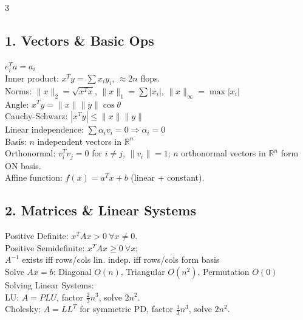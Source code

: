 \documentclass[8pt,landscape]{extarticle}
\newcommand{\R}{\mathbb{R}}
\newcommand{\norm}[1]{\|#1\|}
\newcommand{\1}{\mathbf{1}}
\newcommand{\0}{\mathbf{0}}
\begin{document}
\begin{multicols*}{3}

\subsection*{1. Vectors \& Basic Ops}
$e_i^Ta=a_i$\\
Inner product: $x^Ty = \sum x_i y_i$, $\approx 2n$ flops. \\
Norms: $\norm{x}_2 = \sqrt{x^Tx}$, $\norm{x}_1 = \sum|x_i|$, $\norm{x}_\infty = \max|x_i|$ \\
Angle: $x^Ty = \norm{x}\norm{y}\cos\theta$ \\
Cauchy-Schwarz: $|x^Ty| \le \norm{x}\norm{y}$\\
Linear independence: $\sum\alpha_i v_i=0 \Rightarrow \alpha_i=0$ \\
Basis: $n$ independent vectors in $\R^n$ \\
Orthonormal: $v_i^Tv_j=0$ for $i\ne j$, $\|v_i\|=1$; $n$ orthonormal vectors in $\R^n$ form ON basis.\\
Affine function: $f(x)=a^Tx+b$ (linear + constant).

\subsection*{2. Matrices \& Linear Systems}
Positive Definite: $x^TAx>0\ \forall x\ne0$. \\
Positive Semidefinite: $x^TAx\ge0\ \forall x$; \\
$A^{-1}$ exists iff rows/cols lin. indep. iff rows/cols form basis \\
Solve $Ax=b$: Diagonal $O(n)$, Triangular $O(n^2)$, Permutation $O(0)$ \\
Solving Linear Systems: \\
LU: $A=PLU$, factor $\frac23n^3$, solve $2n^2$. \\
Cholesky: $A=LL^T$ for symmetric PD, factor $\frac13n^3$, solve $2n^2$.


\end{multicols*}
\end{document}
